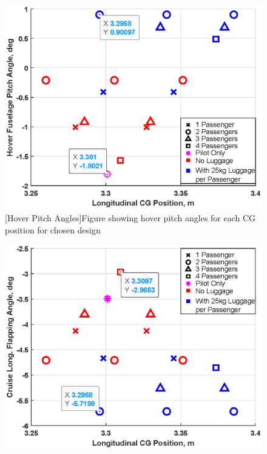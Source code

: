 \documentclass[11pt,a4paper]{article}
\begin{document}
\begin{appendices}
\begin{figure}[H]
\begin{minipage}{.49\textwidth}
\end{minipage}\hspace{0.2cm}
\begin{minipage}{.49\textwidth}
  \centering
  \includegraphics[width=\linewidth]{CGHOVERP.eps}
  [Hover Pitch Angles]{Figure showing hover pitch angles for each CG position for chosen design}
  \label{fig:CGHOVERP}
\end{minipage}
\end{figure}
\begin{figure}[H]
\centering
\begin{minipage}{.49\textwidth}
  \centering
  \includegraphics[width=\linewidth]{CGCRUISEF.eps}

\end{minipage}
\end{figure}
\end{appendices}
\end{document}
